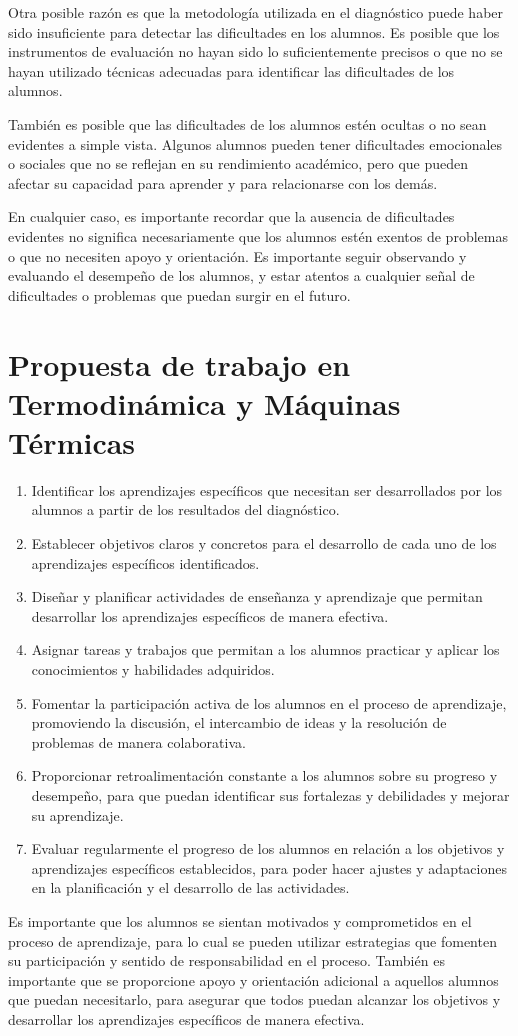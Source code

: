 \documentclass[a4paper,12pt]{book}
\newcommand{\mat}{ Termodinámica y Máquinas Térmicas}
\begin{document}
Otra posible razón es que la metodología utilizada en el diagnóstico puede haber sido insuficiente para detectar las dificultades en los alumnos. Es posible que los instrumentos de evaluación no hayan sido lo suficientemente precisos o que no se hayan utilizado técnicas adecuadas para identificar las dificultades de los alumnos.

También es posible que las dificultades de los alumnos estén ocultas o no sean evidentes a simple vista. Algunos alumnos pueden tener dificultades emocionales o sociales que no se reflejan en su rendimiento académico, pero que pueden afectar su capacidad para aprender y para relacionarse con los demás.

En cualquier caso, es importante recordar que la ausencia de dificultades evidentes no significa necesariamente que los alumnos estén exentos de problemas o que no necesiten apoyo y orientación. Es importante seguir observando y evaluando el desempeño de los alumnos, y estar atentos a cualquier señal de dificultades o problemas que puedan surgir en el futuro.


\section{Propuesta de trabajo en \mat}
\begin{enumerate}
\item Identificar los aprendizajes específicos que necesitan ser desarrollados por los alumnos a partir de los resultados del diagnóstico.
\item Establecer objetivos claros y concretos para el desarrollo de cada uno de los aprendizajes específicos identificados.
\item Diseñar y planificar actividades de enseñanza y aprendizaje que permitan desarrollar los aprendizajes específicos de manera efectiva.
\item Asignar tareas y trabajos que permitan a los alumnos practicar y aplicar los conocimientos y habilidades adquiridos.
\item Fomentar la participación activa de los alumnos en el proceso de aprendizaje, promoviendo la discusión, el intercambio de ideas y la resolución de problemas de manera colaborativa.
\item Proporcionar retroalimentación constante a los alumnos sobre su progreso y desempeño, para que puedan identificar sus fortalezas y debilidades y mejorar su aprendizaje.
\item Evaluar regularmente el progreso de los alumnos en relación a los objetivos y aprendizajes específicos establecidos, para poder hacer ajustes y adaptaciones en la planificación y el desarrollo de las actividades.
\end{enumerate}

Es importante que los alumnos se sientan motivados y comprometidos en el proceso de aprendizaje, para lo cual se pueden utilizar estrategias que fomenten su participación y sentido de responsabilidad en el proceso. También es importante que se proporcione apoyo y orientación adicional a aquellos alumnos que puedan necesitarlo, para asegurar que todos puedan alcanzar los objetivos y desarrollar los aprendizajes específicos de manera efectiva.
\end{document}

